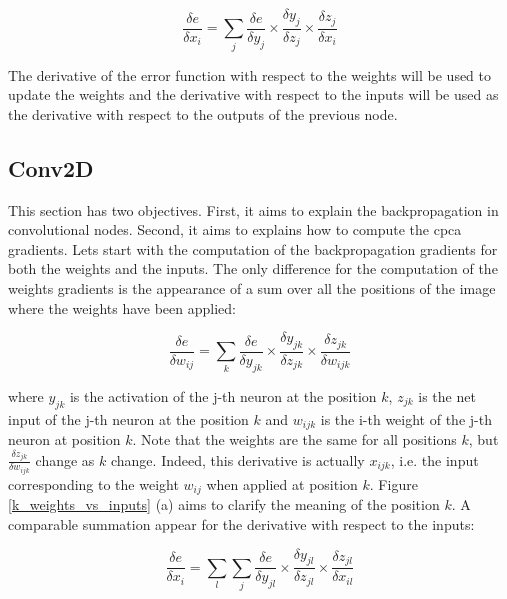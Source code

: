 \documentclass[11pt]{report}
\begin{document}
\begin{equation}
\frac{\delta e}{\delta x_{i}} = \sum_{j} \frac{\delta e}{\delta y_j} \times \frac{\delta y_j}{\delta z_j} \times \frac{\delta z_j}{\delta x_i}
\end{equation}

\noindent The derivative of the error function with respect to the weights will be used to update the weights and the derivative with respect to the inputs will be used as the derivative with respect to the outputs of the previous node.

\subsection{Conv2D} \label{sec:conv2d}

This section has two objectives. First, it aims to explain the backpropagation in convolutional nodes. Second, it aims to explains how to compute the \acrshort{cpca} gradients. Lets start with the computation of the backpropagation gradients for both the weights and the inputs. The only difference for the computation of the weights gradients is the appearance of a sum over all the positions of the image where the weights have been applied:

\begin{equation} \label{eq:dwc2d}
\frac{\delta e}{\delta w_{ij}} = \sum_{k} \frac{\delta e}{\delta y_{jk}} \times \frac{\delta y_{jk}}{\delta z_{jk}} \times \frac{\delta z_{jk}}{\delta w_{ijk}}
\end{equation}

\noindent where $y_{jk}$ is the activation of the j-th neuron at the position $k$, $z_{jk}$ is the net input of the j-th neuron at the position $k$ and $w_{ijk}$ is the i-th weight of the j-th neuron at position $k$. Note that the weights are the same for all positions $k$, but $\frac{\delta z_{jk}}{\delta w_{ijk}}$ change as $k$ change. Indeed, this derivative is actually $x_{ijk}$, i.e. the input corresponding to the weight $w_{ij}$ when applied at position $k$. Figure \ref{k_weights_vs_inputs} (a) aims to clarify the meaning of the position $k$. A comparable summation appear for the derivative with respect to the inputs:

\begin{equation}
\frac{\delta e}{\delta x_{i}} = \sum_{l} \sum_{j} \frac{\delta e}{\delta y_{jl}} \times \frac{\delta y_{jl}}{\delta z_{jl}} \times \frac{\delta z_{jl}}{\delta x_{il}}
\end{equation}
\end{document}
